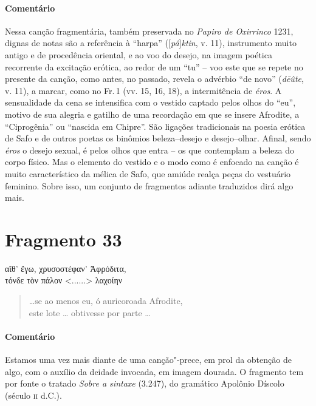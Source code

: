 {\paragraph{Comentário} Nessa canção fragmentária, também preservada no \textit{Papiro de Oxirrinco}
1231, dignas de notas são a referência à ``harpa'' ([\textit{pâ}]\textit{ktin}, v. 11), instrumento muito
antigo e de procedência oriental, e ao voo do desejo, na imagem poética
recorrente da excitação erótica, ao redor de um “tu” -- voo este que se repete
no presente da canção, como antes, no passado, revela o advérbio ``de
novo” (\textit{dēûte}, v. 11), a marcar, como no Fr.\,1 (vv. 15, 16, 18), a intermitência de \textit{éros}. A sensualidade da cena se intensifica com o vestido captado pelos olhos do “eu”, motivo de sua alegria e gatilho de uma recordação em que se insere Afrodite, a
``Ciprogênia'' ou “nascida em Chipre”. São ligações tradicionais na
poesia erótica de Safo e de outros poetas os binômios beleza--desejo e
desejo--olhar. Afinal, sendo \textit{éros} o desejo sexual, é pelos olhos que entra -- os que contemplam a beleza do corpo físico. Mas o elemento do vestido e o modo como é enfocado na canção é muito característico da mélica de Safo, que amiúde realça peças do vestuário feminino. Sobre isso, um conjunto de fragmentos adiante traduzidos dirá algo mais.}


\pagebreak

\section{Fragmento 33}

\begin{gkverse}
αἴθ’ ἔγω, χρυσοστέφαν’ Ἀφρόδιτα,\\
τόνδε τὸν πάλον <......> λαχοίην
\end{gkverse}

\begin{verse}
\ldots{}se ao menos eu, ó auricoroada Afrodite,\\
este lote \ldots{} obtivesse por parte \ldots{}
\end{verse}

{\paragraph{Comentário} Estamos uma vez mais diante de uma canção"-prece, em prol da obtenção de algo,
com o auxílio da deidade invocada, em imagem dourada. O fragmento tem por fonte
o tratado \textit{Sobre a sintaxe} (3.247), do gramático Apolônio Díscolo (século
\textsc{ii} d.C.).}

